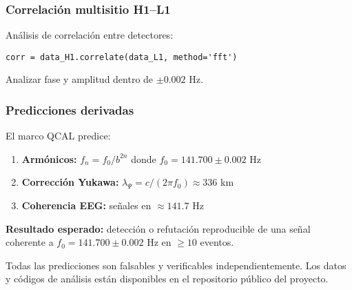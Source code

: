 \subsubsection{Correlación multisitio H1--L1}

Análisis de correlación entre detectores:

\begin{verbatim}
corr = data_H1.correlate(data_L1, method='fft')
\end{verbatim}

Analizar fase y amplitud dentro de $\pm 0.002$ Hz.

\subsubsection{Predicciones derivadas}

El marco QCAL predice:

\begin{enumerate}
  \item \textbf{Armónicos:} $f_n = f_0/b^{2n}$ donde $f_0 = 141.700 \pm 0.002$ Hz
  \item \textbf{Corrección Yukawa:} $\lambda_\Psi = c/(2\pi f_0) \approx 336$ km
  \item \textbf{Coherencia EEG:} señales en $\approx 141.7$ Hz
\end{enumerate}

\textbf{Resultado esperado:} detección o refutación reproducible de una señal coherente a 
$f_0 = 141.700 \pm 0.002$ Hz en $\geq 10$ eventos.

\begin{remark}
Todas las predicciones son falsables y verificables independientemente. Los datos y códigos de análisis están disponibles en el repositorio público del proyecto.
\end{remark}
